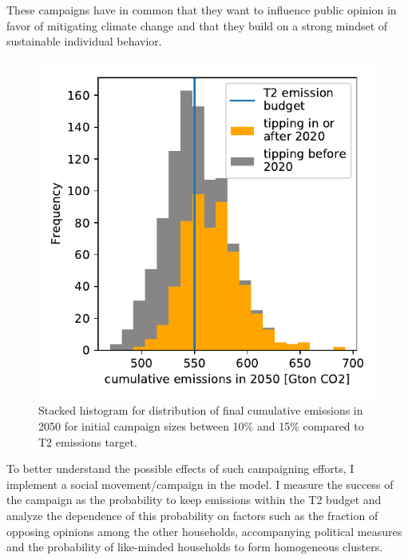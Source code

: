 These campaigns have in common that they want to influence public opinion in favor of mitigating climate change and that they build on a strong mindset of sustainable individual behavior.\\

\begin{figure}
	\vspace{-.4 cm}
        \hspace{-1.4 cm}
        \includegraphics[width = .57 \textwidth]{./figures/emissions_with_campaign.pdf}
        \caption{Stacked histogram for distribution of final cumulative emissions in 2050 for initial campaign sizes between 10\% and 15\% compared to T2 emissions target. \label{fig:campaign_sucess}}
\end{figure}

To better understand the possible effects of such campaigning efforts, I implement a social movement/campaign in the model. I measure the success of the campaign as the probability to keep emissions within the T2 budget and analyze the dependence of 
this probability on factors such as the fraction of opposing opinions among the other households, accompanying political measures and the probability of like-minded households to form homogeneous clusters.\\

